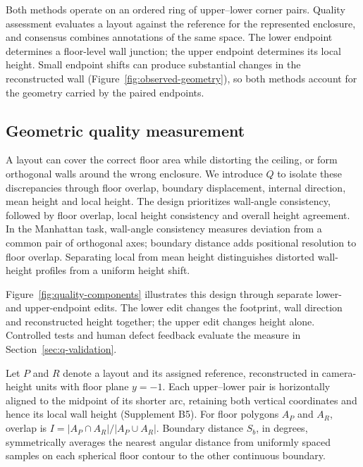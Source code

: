 \label{sec:methods}

Both methods operate on an ordered ring of upper--lower corner pairs. Quality assessment evaluates a layout against the reference for the represented enclosure, and consensus combines annotations of the same space. The lower endpoint determines a floor-level wall junction; the upper endpoint determines its local height. Small endpoint shifts can produce substantial changes in the reconstructed wall (Figure~\ref{fig:observed-geometry}), so both methods account for the geometry carried by the paired endpoints.



\subsection{Geometric quality measurement}
\label{sec:quality}

A layout can cover the correct floor area while distorting the ceiling, or form orthogonal walls around the wrong enclosure. We introduce $Q$ to isolate these discrepancies through floor overlap, boundary displacement, internal direction, mean height and local height. The design prioritizes wall-angle consistency, followed by floor overlap, local height consistency and overall height agreement. In the Manhattan task, wall-angle consistency measures deviation from a common pair of orthogonal axes; boundary distance adds positional resolution to floor overlap. Separating local from mean height distinguishes distorted wall-height profiles from a uniform height shift.

Figure~\ref{fig:quality-components} illustrates this design through separate lower- and upper-endpoint edits. The lower edit changes the footprint, wall direction and reconstructed height together; the upper edit changes height alone. Controlled tests and human defect feedback evaluate the measure in Section~\ref{sec:q-validation}.



Let $P$ and $R$ denote a layout and its assigned reference, reconstructed in camera-height units with floor plane $y=-1$. Each upper--lower pair is horizontally aligned to the midpoint of its shorter arc, retaining both vertical coordinates and hence its local wall height (Supplement B5). For floor polygons $A_P$ and $A_R$, overlap is $I=|A_P\cap A_R|/|A_P\cup A_R|$. Boundary distance $S_b$, in degrees, symmetrically averages the nearest angular distance from uniformly spaced samples on each spherical floor contour to the other continuous boundary.

